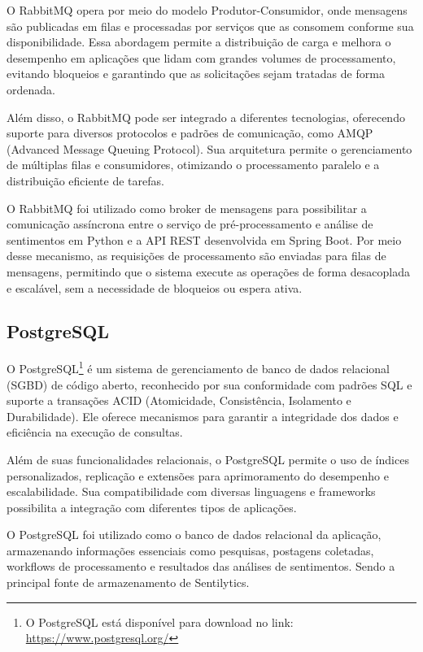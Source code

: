 \documentclass[
	12pt,				%
	oneside,			%
	a4paper,			%
	english,			%
	french,				%
	spanish,			%
	brazil				%
	]{abntex2}
\begin{document}
O RabbitMQ opera por meio do modelo Produtor-Consumidor, onde mensagens
são publicadas em filas e processadas por serviços que as consomem
conforme sua disponibilidade. Essa abordagem permite a distribuição de
carga e melhora o desempenho em aplicações que lidam com grandes volumes
de processamento, evitando bloqueios e garantindo que as solicitações
sejam tratadas de forma ordenada.

Além disso, o RabbitMQ pode ser integrado a diferentes tecnologias,
oferecendo suporte para diversos protocolos e padrões de comunicação,
como AMQP (Advanced Message Queuing Protocol). Sua arquitetura permite o
gerenciamento de múltiplas filas e consumidores, otimizando o
processamento paralelo e a distribuição eficiente de tarefas.

O RabbitMQ foi utilizado como broker de mensagens para possibilitar a
comunicação assíncrona entre o serviço de pré-processamento e análise de
sentimentos em Python e a API REST desenvolvida em Spring Boot. Por meio
desse mecanismo, as requisições de processamento são enviadas para filas
de mensagens, permitindo que o sistema execute as operações de forma
desacoplada e escalável, sem a necessidade de bloqueios ou espera ativa.

\hypertarget{postgresql}{%
\subsection{PostgreSQL}\label{postgresql}}

O PostgreSQL\footnote{O PostgreSQL está disponível para download no
  link: \url{https://www.postgresql.org/}} é um sistema de gerenciamento
de banco de dados relacional (SGBD) de código aberto, reconhecido por
sua conformidade com padrões SQL e suporte a transações ACID
(Atomicidade, Consistência, Isolamento e Durabilidade). Ele oferece
mecanismos para garantir a integridade dos dados e eficiência na
execução de consultas.

Além de suas funcionalidades relacionais, o PostgreSQL permite o uso de
índices personalizados, replicação e extensões para aprimoramento do
desempenho e escalabilidade. Sua compatibilidade com diversas linguagens
e frameworks possibilita a integração com diferentes tipos de
aplicações.

O PostgreSQL foi utilizado como o banco de dados relacional da
aplicação, armazenando informações essenciais como pesquisas, postagens
coletadas, workflows de processamento e resultados das análises de
sentimentos. Sendo a principal fonte de armazenamento de Sentilytics.
\end{document}
